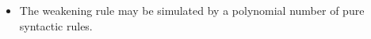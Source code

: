 \begin{frame}
	\begin{itemize}
        \pause
		\item The weakening rule may be simulated by a polynomial number of pure
	        syntactic rules.
	\end{itemize}
\end{frame}



